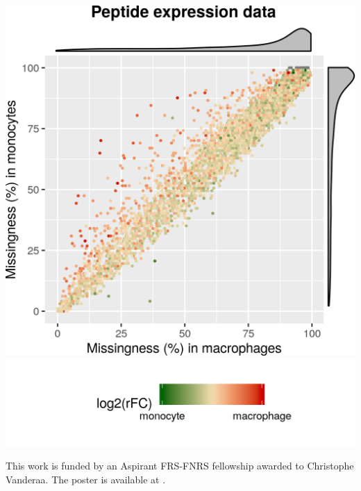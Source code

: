 \documentclass{article}
\begin{document}
\begin{multicols}{2}
\begin{minipage}[t]{0.45\linewidth}
\begin{center}
    \includegraphics[width=0.85\linewidth, trim={0 2cm 0 2cm}]{figs/missing.png} \\
    \vspace{0.5cm}
    \includegraphics[width=0.6\linewidth, trim={2cm 1cm 0cm 3.8cm},clip]{figs/missing-leg.png}
  \end{center}
\end{minipage}


\noindent
This work is funded by an Aspirant FRS-FNRS fellowship awarded to Christophe Vanderaa. The poster is available at {\color{blue}{https://github.com/cvanderaa/ABLS2020-Poster}}.


\scriptsize
 


\end{multicols}
\end{document}
